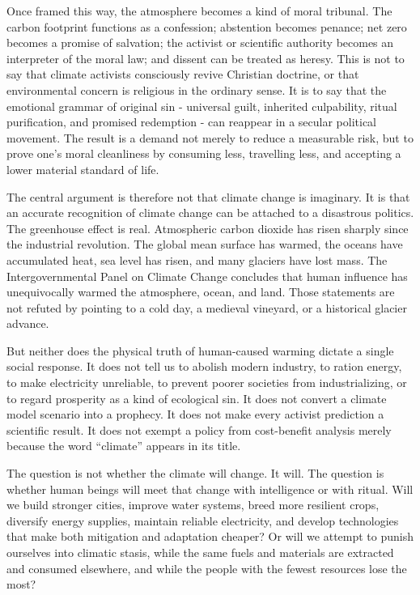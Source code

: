 ﻿\documentclass[12pt,a4paper]{book}
\begin{document}
Once framed this way, the atmosphere becomes a kind of moral tribunal. The carbon footprint functions as a confession; abstention becomes penance; net zero becomes a promise of salvation; the activist or scientific authority becomes an interpreter of the moral law; and dissent can be treated as heresy. This is not to say that climate activists consciously revive Christian doctrine, or that environmental concern is religious in the ordinary sense. It is to say that the emotional grammar of original sin - universal guilt, inherited culpability, ritual purification, and promised redemption - can reappear in a secular political movement. The result is a demand not merely to reduce a measurable risk, but to prove one's moral cleanliness by consuming less, travelling less, and accepting a lower material standard of life.

The central argument is therefore not that climate change is imaginary. It is that an accurate recognition of climate change can be attached to a disastrous politics. The greenhouse effect is real. Atmospheric carbon dioxide has risen sharply since the industrial revolution. The global mean surface has warmed, the oceans have accumulated heat, sea level has risen, and many glaciers have lost mass. The Intergovernmental Panel on Climate Change concludes that human influence has unequivocally warmed the atmosphere, ocean, and land. Those statements are not refuted by pointing to a cold day, a medieval vineyard, or a historical glacier advance. \cite{IPCC2021HumanInfluence,IPCC2023Synthesis}

But neither does the physical truth of human-caused warming dictate a single social response. It does not tell us to abolish modern industry, to ration energy, to make electricity unreliable, to prevent poorer societies from industrializing, or to regard prosperity as a kind of ecological sin. It does not convert a climate model scenario into a prophecy. It does not make every activist prediction a scientific result. It does not exempt a policy from cost-benefit analysis merely because the word ``climate'' appears in its title.

The question is not whether the climate will change. It will. The question is whether human beings will meet that change with intelligence or with ritual. Will we build stronger cities, improve water systems, breed more resilient crops, diversify energy supplies, maintain reliable electricity, and develop technologies that make both mitigation and adaptation cheaper? Or will we attempt to punish ourselves into climatic stasis, while the same fuels and materials are extracted and consumed elsewhere, and while the people with the fewest resources lose the most?
\end{document}
